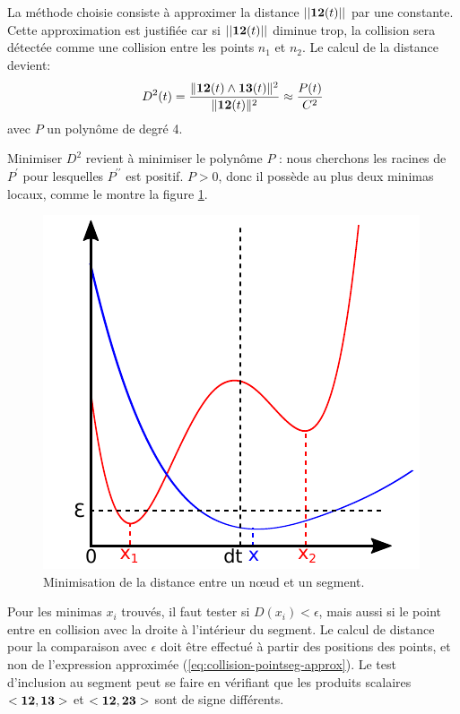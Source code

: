 \documentclass[11pt,class=article,float=false,crop=false]{standalone}
\begin{document}
La méthode choisie consiste à approximer la distance $||\bm{12}(t)||$ par une constante. Cette approximation est justifiée car si $||\bm{12}(t)||$ diminue trop, la collision sera détectée comme une collision entre les points $n_1$ et $n_2$. Le calcul de la distance devient:
\begin{equation}
D^2(t) = \frac{\|\bm{12}(t) \wedge \bm{13}(t)\|^2}
{\|\bm{12}(t)\|^2} \approx \frac{P(t)}
{C^2}
\label{eq:collision-pointseg-approx}
\end{equation}
avec $P$ un polynôme de degré 4.

Minimiser $D^2$ revient à minimiser le polynôme $P$ : nous cherchons les racines de $P^\prime$ pour lesquelles $P^{\prime \prime}$ est positif. $P > 0$, donc il possède au plus deux minimas locaux, comme le montre la figure \ref{fig:collision-primitive-pointseg-polynome}.

\begin{figure}[H]
	\centering
	\includegraphics[height=0.3\textheight]{img/collision-primitive-pointseg-polynome}
	\caption{Minimisation de la distance entre un nœud et un segment.}
	\label{fig:collision-primitive-pointseg-polynome}
\end{figure}

Pour les minimas $x_i$ trouvés, il faut tester si $D(x_i) < \epsilon$, mais aussi si le point entre en collision avec la droite à l'intérieur du segment. Le calcul de distance pour la comparaison avec $\epsilon$ doit être effectué à partir des positions des points, et non de l'expression approximée (\ref{eq:collision-pointseg-approx}). Le test d'inclusion au segment peut se faire en vérifiant que les produits scalaires $<\bm{12},\bm{13}>$ et $<\bm{12},\bm{23}>$ sont de signe différents.
\end{document}
